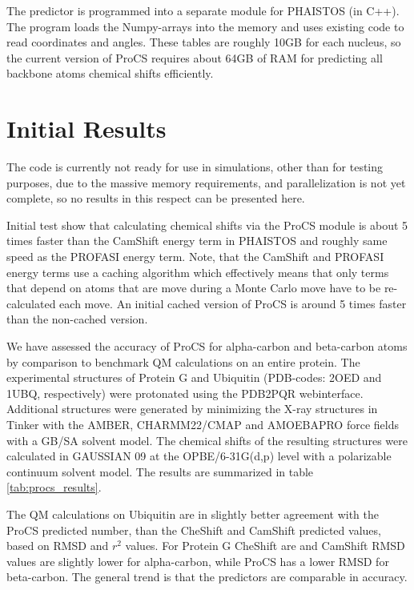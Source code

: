 The predictor is programmed into a separate module for PHAISTOS (in C++).
The program loads the Numpy-arrays into the memory and uses existing code to read coordinates and angles.
These tables are roughly 10GB for each nucleus, so the current version of ProCS requires about 64GB of RAM for predicting all backbone atoms chemical shifts efficiently.


\section{Initial Results}
The code is currently not ready for use in simulations, other than for testing purposes, due to the massive memory requirements, and parallelization is not yet complete, so no results in this respect can be presented here.

Initial test show that calculating chemical shifts via the ProCS module is about 5 times faster than the CamShift energy term in PHAISTOS and roughly same speed as the PROFASI energy term.
Note, that the CamShift and PROFASI energy terms use a caching algorithm which effectively means that only terms that depend on atoms that are move during a Monte Carlo move have to be re-calculated each move.
An initial cached version of ProCS is around 5 times faster than the non-cached version.

We have assessed the accuracy of ProCS for alpha-carbon and beta-carbon atoms by comparison to benchmark QM calculations on an entire protein.
The experimental structures of Protein G and Ubiquitin (PDB-codes: 2OED and 1UBQ, respectively) were protonated using the PDB2PQR webinterface.
Additional structures were generated by minimizing the X-ray structures in Tinker with the AMBER, CHARMM22/CMAP and AMOEBAPRO force fields with a GB/SA solvent model.
The chemical shifts of the resulting structures were calculated in GAUSSIAN 09 at the OPBE/6-31G(d,p) level with a polarizable continuum solvent model. The results are summarized in table \ref{tab:procs_results}.

The QM calculations on Ubiquitin are in slightly better agreement with the ProCS predicted number, than the CheShift and CamShift predicted values, based on RMSD and $r^2$ values. For Protein G CheShift are and CamShift RMSD values are slightly lower for alpha-carbon, while ProCS has a lower RMSD for beta-carbon.
The general trend is that the predictors are comparable in accuracy.





